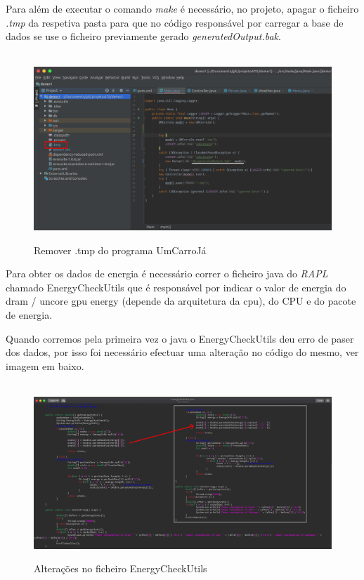 Para além de executar o comando \textit{make} é necessário, no projeto, apagar o ficheiro \textit{.tmp} da respetiva pasta para que no código responsável por carregar a base de dados se  use o ficheiro previamente gerado \textit{generatedOutput.bak}.


\begin{figure}[H]
    \centering
    \hbox{\hspace{-4em} \includegraphics[width=1.2\textwidth]{images/remove_tmp.png}}
    \label{fig49}
    \caption{Remover .tmp do programa UmCarroJá}
\end{figure}

Para obter os dados de energia é necessário correr o ficheiro java do \textit{RAPL} chamado EnergyCheckUtils que é responsável por indicar o valor de energia do dram / uncore gpu energy (depende da arquitetura da cpu), do CPU e do pacote de energia.

Quando corremos pela primeira vez o java o EnergyCheckUtils deu erro de paser dos dados, por isso foi necessário efectuar uma alteração no código do mesmo, ver imagem em baixo.

\newpage
\begin{figure}[H]
    \hbox{\hspace{-10em} \includegraphics[width=1.5\textwidth]{images/energycheckutils.png}}
    \label{fig50}
    \caption{Alterações no ficheiro EnergyCheckUtils}
\end{figure}

